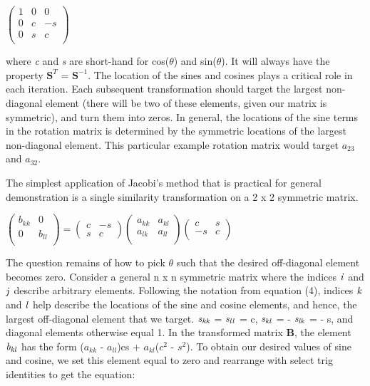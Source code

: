 \documentclass[10pt,showpacs,preprintnumbers,footinbib,amsmath,amssymb,aps,prl,twocolumn,groupedaddress,superscriptaddress,showkeys]{revtex4-1}
\begin{document}
		\begin{center}
		$\begin{pmatrix}
			1 & 0 & 0 \\
			0 & c & -s \\
			0 & s & c   \\
		\end{pmatrix}$
		\end{center}

where {\it c} and {\it s} are short-hand for cos(${\theta}$) and sin(${\theta}$). It will always have the property ${\mathbf S^{T}}$ = ${\mathbf S^{-1}}$. The location of the sines and cosines plays a critical role in each iteration. Each subsequent transformation should target the largest non-diagonal element (there will be two of these elements, given our matrix is symmetric), and turn them into zeros. In general, the locations of the sine terms in the rotation matrix is determined by the symmetric locations of the largest non-diagonal element. This particular example rotation matrix would target $a_{23}$ and $a_{32}$. 

The simplest application of Jacobi's method that is practical for general demonstration is a single similarity transformation on a 2 x 2 symmetric matrix.

\begin{center}
		$\begin{pmatrix}
			b_{kk} & 0\\
			0 & b_{ll}\\
		\end{pmatrix} = 
		 \begin{pmatrix}
			c & -s \\
			s & c\
		\end{pmatrix}
		\begin{pmatrix}
			a_{kk} & a_{kl}\\
			a_{lk} & a_{ll}\\
		\end{pmatrix}
		\begin{pmatrix}
			c & s \\
			-s & c\\
		\end{pmatrix}$
\end{center}

The question remains of how to pick ${\theta}$ such that the desired off-diagonal element becomes zero. Consider a general n x n symmetric matrix where the indices ${\it i}$ and ${\it j}$ describe arbitrary elements. Following the notation from equation (4), indices ${\it k}$ and ${\it l}$ help describe the locations of the sine and cosine elements, and hence, the largest off-diagonal element that we target. ${\it s_{kk}}$ =  ${\it s_{ll}}$ = c, ${\it s_{kl}}$ = - ${\it s_{lk}}$ = - s, and diagonal elements otherwise equal 1. In the transformed matrix ${\mathbf B}$, the element ${\it b_{kl}}$ has the form ($a_{kk}$ - $a_{ll}$)cs + $a_{kl}$($c^{2}$ - $s^{2}$). To obtain our desired values of sine and cosine, we set this element equal to zero and rearrange with select trig identities to get the equation:
\end{document}

